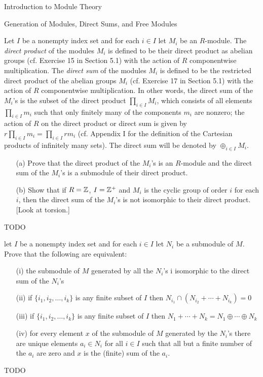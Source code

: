 \begin{chapter}{Introduction to Module Theory}
\begin{section}{Generation of Modules, Direct Sums, and Free Modules}
\begin{problem}\label{ex:10.3.20}
Let $I$ be a nonempty index set and for each $i\in I$ let $M_i$ be an $R$-module. The \emph{direct product} of the modules $M_i$ is defined to be their direct product as abelian groups (cf. Exercise 15 in Section 5.1) with the action of $R$ componentwise multiplication. The \emph{direct sum} of the modules $M_i$ is defined to be the restricted direct product of the abelian groups $M_i$ (cf. Exercise 17 in Section 5.1) with the action of $R$ componentwise multiplication. In other words, the direct sum of the $M_i$'s is the subset of the direct product $\prod_{i\in I}M_i$, which consists of all elements $\prod_{i\in I}m_i$ such that only finitely many of the components $m_i$ are nonzero; the action of $R$ on the direct product or direct sum is given by $r\prod_{i\in I}m_i = \prod_{i\in I}rm_i$ (cf. Appendix I for the definition of the Cartesian products of infinitely many sets). The direct sum will be denoted by $\oplus_{i\in I} M_i$. \begin{enumerate}
\item[(a)] Prove that the direct product of the $M_i$'s is an $R$-module and the direct sum of the $M_i$'s is a submodule of their direct product.
\item[(b)] Show that if $R=\mathbb{Z}$, $I=\mathbb{Z}^+$ and $M_i$ is the cyclic group of order $i$ for each $i$, then the direct sum of the $M_i$'s is not isomorphic to their direct product. [Look at torsion.]
\end{enumerate}
\end{problem}
\begin{solution}TODO

\end{solution}\oneperpage



\begin{problem}\label{ex:10.3.21}
let $I$ be a nonempty index set and for each $i\in I$ let $N_i$ be a submodule of $M$. Prove that the following are equivalent:\begin{enumerate}
\item[(i)] the submodule of $M$ generated by all the $N_i$'s i isomorphic to the direct sum of the $N_i$'s
\item[(ii)] if $\{i_1,i_2,\ldots,i_k\}$ is any finite subset of $I$ then $N_{i_1}\cap (N_{i_2}+\cdots +N_{i_k}) = 0$
\item[(iii)] if $\{i_1,i_2,\ldots,i_k\}$ is any finite subset of $I$ then $N_1+\cdots +N_k = N_1\oplus \cdots \oplus N_k$
\item[(iv)] for every element $x$ of the submodule of $M$ generated by the $N_i$'s there are unique elements $a_i\in N_i$ for all $i\in I$ such that all but a finite number of the $a_i$ are zero and $x$ is the (finite) sum of the $a_i$. 
\end{enumerate}
\end{problem}
\begin{solution}TODO


\end{solution}
\end{section}
\end{chapter}

